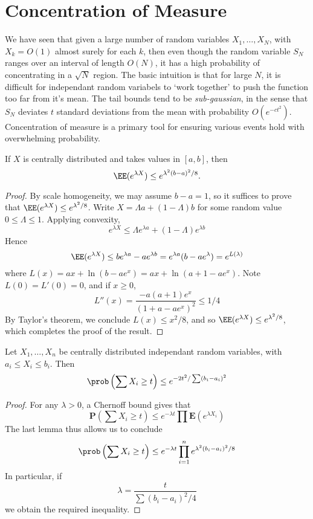 \section{Concentration of Measure}

We have seen that given a large number of random variables $X_1, \dots, X_N$, with $X_k = O(1)$ almost surely for each $k$, then even though the random variable $S_N$ ranges over an interval of length $O(N)$, it has a high probability of concentrating in a $\sqrt{N}$ region. The basic intuition is that for large $N$, it is difficult for independant random variabels to `work together' to push the function too far from it's mean. The tail bounds tend to be {\it sub-gaussian}, in the sense that $S_N$ deviates $t$ standard deviations from the mean with probability $O(e^{-c t^2})$. Concentration of measure is a primary tool for ensuring various events hold with overwhelming probability.

\begin{lemma}
    If $X$ is centrally distributed and takes values in $[a,b]$, then
    \[ \EE(e^{\lambda X}) \leq e^{\lambda^2(b-a)^2/8}. \]
\end{lemma}
\begin{proof}
    By scale homogeneity, we may assume $b - a = 1$, so it suffices to prove that $\EE(e^{\lambda X}) \leq e^{\lambda^2/8}$. Write $X = \Lambda a + (1 - \Lambda) b$ for some random value $0 \leq \Lambda \leq 1$. Applying convexity,
    \[ e^{\lambda X} \leq \Lambda e^{\lambda a} + (1 - \Lambda) e^{\lambda b} \]
    Hence
    \[ \EE(e^{\lambda X}) \leq b e^{\lambda a} - a e^{\lambda b} = e^{\lambda a} (b - ae^{\lambda}) = e^{L(\lambda)} \]
    where $L(x) = a x + \ln(b - ae^x) = ax + \ln(a + 1 - ae^x)$. Note $L(0) = L'(0) = 0$, and if $x \geq 0$,
    \[ L''(x) = \frac{-a(a+1)e^x}{(1 + a - ae^x)^2} \leq 1/4 \]
    By Taylor's theorem, we conclude $L(x) \leq x^2/8$, and so $\EE(e^{\lambda X}) \leq e^{\lambda^2/8}$, which completes the proof of the result.
\end{proof}

\begin{theorem}
    Let $X_1, \dots, X_n$ be centrally distributed independant random variables, with $a_i \leq X_i \leq b_i$. Then
    \[ \prob \left( \sum X_i \geq t \right) \leq e^{-2t^2/\sum (b_i - a_i)^2} \]
\end{theorem}
\begin{proof}
For any $\lambda > 0$, a Chernoff bound gives that
    \[ \mathbf{P} \left( \sum X_i \geq t \right) \leq e^{- \lambda t} \prod \mathbf{E}(e^{\lambda X_i}) \]
    The last lemma thus allows us to conclude
    \[ \prob \left( \sum X_i \geq t \right) \leq e^{-\lambda t} \prod_{i = 1}^n e^{\lambda^2 (b_i - a_i)^2/8} \]
    In particular, if
    \[ \lambda = \frac{t}{\sum (b_i - a_i)^2/4} \]
    we obtain the required inequality.
\end{proof}

